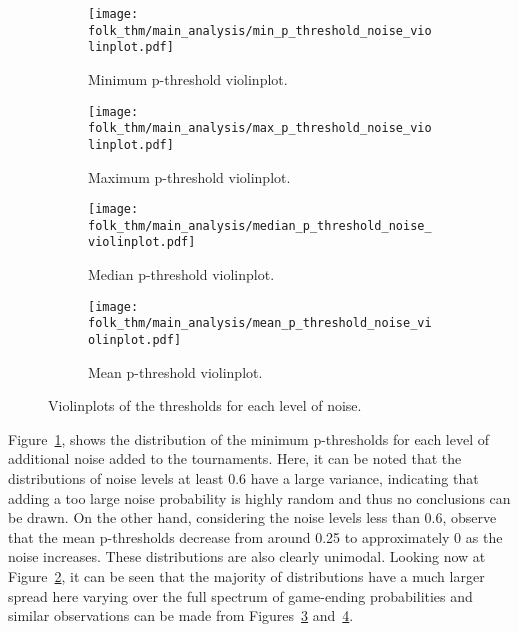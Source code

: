 \begin{figure}
    \begin{subfigure}{0.45\textwidth}
        \centering
        \texttt{[image: folk\_thm/main\_analysis/min\_p\_threshold\_noise\_violinplot.pdf]}
        \caption{Minimum p-threshold violinplot.}\label{subfig:min_thresh_noise_violinplot}
    \end{subfigure}
    \begin{subfigure}{0.45\textwidth}
        \centering
        \texttt{[image: folk\_thm/main\_analysis/max\_p\_threshold\_noise\_violinplot.pdf]}
        \caption{Maximum p-threshold violinplot.}\label{subfig:max_thresh_noise_violinplot}
    \end{subfigure}

    \begin{subfigure}{0.45\textwidth}
        \centering
        \texttt{[image: folk\_thm/main\_analysis/median\_p\_threshold\_noise\_violinplot.pdf]}
        \caption{Median p-threshold violinplot.}\label{subfig:median_thresh_noise_violinplot}
    \end{subfigure}
    \begin{subfigure}{0.45\textwidth}
        \centering
        \texttt{[image: folk\_thm/main\_analysis/mean\_p\_threshold\_noise\_violinplot.pdf]}
        \caption{Mean p-threshold violinplot.}\label{subfig:mean_thresh_noise_violinplot}
    \end{subfigure}
    \caption{Violinplots of the thresholds for each level of noise.}\label{fig:noise_p_thresh_violinplot}
\end{figure}

Figure~\ref{subfig:min_thresh_noise_violinplot}, shows the distribution of the
minimum p-thresholds for each level of additional noise added to the
tournaments. Here, it can be noted that the distributions of noise levels at
least 0.6 have a large variance, indicating that adding a too large noise
probability is highly random and thus no conclusions can be drawn. On the
other hand, considering the noise levels less than 0.6, observe that the mean
p-thresholds decrease from around 0.25 to approximately 0 as the noise
increases. These distributions are also clearly unimodal. Looking now at
Figure~\ref{subfig:max_thresh_noise_violinplot}, it can be seen that the
majority of distributions have a much larger spread here varying over the full
spectrum of game-ending probabilities and similar observations can be made from
Figures~\ref{subfig:median_thresh_noise_violinplot}
and~\ref{subfig:mean_thresh_noise_violinplot}. 


